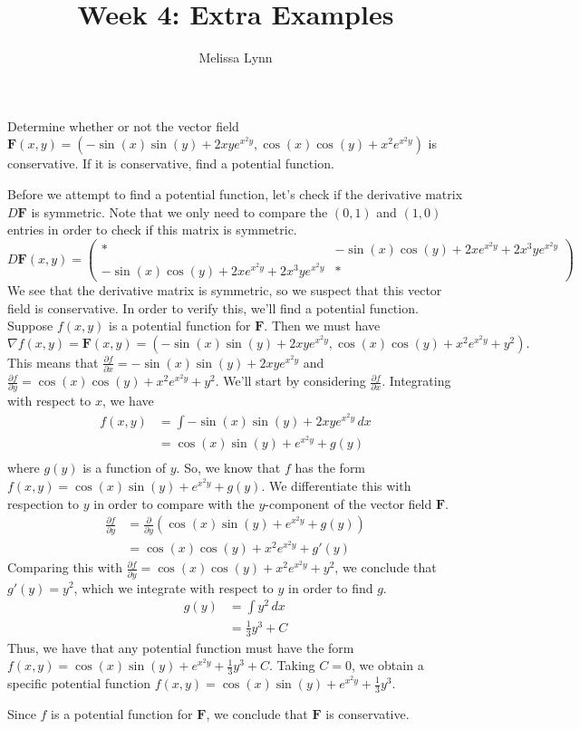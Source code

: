 \documentclass{ximera}
\title{Week 4: Extra Examples}
\author{Melissa Lynn}
\begin{document}
  
\begin{abstract}  
\end{abstract}  
\maketitle


\begin{example}
Determine whether or not the vector field $\mathbf{F}(x,y) = (-\sin(x)\sin(y)+2xye^{x^2y},\cos(x)\cos(y)+x^2e^{x^2y})$ is conservative. If it is conservative, find a potential function.
\begin{explanation}
Before we attempt to find a potential function, let's check if the derivative matrix $D\mathbf{F}$ is symmetric. Note that we only need to compare the $(0,1)$ and $(1,0)$ entries in order to check if this matrix is symmetric.
\[
D\mathbf{F}(x,y) = \left(\begin{array}{cc}
*&-\sin(x)\cos(y)+2xe^{x^2y}+2x^3ye^{x^2y}\\
-\sin(x)\cos(y)+2xe^{x^2y}+2x^3ye^{x^2y}&*\end{array}\right)
\]
We see that the derivative matrix is symmetric, so we suspect that this vector field is conservative. In order to verify this, we'll find a potential function.
Suppose $f(x,y)$ is a potential function for $\mathbf{F}$. Then we must have
\[
\nabla f(x,y)=\mathbf{F}(x,y)=(-\sin(x)\sin(y)+2xye^{x^2y},\cos(x)\cos(y)+x^2e^{x^2y}+y^2).
\]
This means that $\frac{\partial f}{\partial x} = -\sin(x)\sin(y)+2xye^{x^2y}$ and $\frac{\partial f}{\partial y} = \cos(x)\cos(y)+x^2e^{x^2y}+y^2$. We'll start by considering $\frac{\partial f}{\partial x}$. Integrating with respect to $x$, we have
\begin{align*}
f(x,y) &= \int -\sin(x)\sin(y)+2xye^{x^2y}\,dx\\
&= \cos(x)\sin(y)+e^{x^2y}+g(y)\\
\end{align*}
where $g(y)$ is a function of $y$. So, we know that $f$ has the form $f(x,y)=\cos(x)\sin(y)+e^{x^2y}+g(y)$. We differentiate this with respection to $y$ in order to compare with the $y$-component of the vector field $\mathbf{F}$.
\begin{align*}
\frac{\partial f}{\partial y} &= \frac{\partial}{\partial y}\left(\cos(x)\sin(y)+e^{x^2y}+g(y)\right)\\
&= \cos(x)\cos(y) + x^2e^{x^2y}+g'(y)
\end{align*}
Comparing this with $\frac{\partial f}{\partial y} = \cos(x)\cos(y)+x^2e^{x^2y}+y^2$, we conclude that $g'(y)=y^2$, which we integrate with respect to $y$ in order to find $g$.
\begin{align*}
g(y) &= \int y^2\,dx\\
&=\frac{1}{3}y^3+C
\end{align*}
Thus, we have that any potential function must have the form $f(x,y) = \cos(x)\sin(y)+e^{x^2y}+\frac{1}{3}y^3+C$. Taking $C=0$, we obtain a specific potential function $f(x,y) = \cos(x)\sin(y)+e^{x^2y}+\frac{1}{3}y^3$.

Since $f$ is a potential function for $\mathbf{F}$, we conclude that $\mathbf{F}$ is conservative.
\end{explanation}
\end{example}
\end{document}
